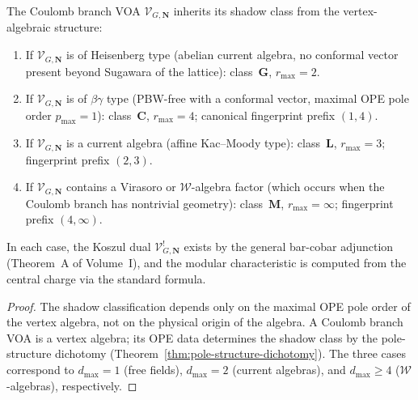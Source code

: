 \begin{proposition}
\label{prop:coulomb-shadow}
The Coulomb branch VOA $\mathcal{V}_{G,\mathbf{N}}$ inherits its
shadow class from the vertex-algebraic structure:
\begin{enumerate}[label=\textup{(\roman*)},nosep]
\item If $\mathcal{V}_{G,\mathbf{N}}$ is of Heisenberg type
 \textup{(}abelian current algebra, no conformal
 vector present beyond Sugawara of the lattice\textup{)}:
 class~$\mathbf{G}$, $r_{\max} = 2$.

\item If $\mathcal{V}_{G,\mathbf{N}}$ is of $\beta\gamma$ type
 \textup{(}PBW-free with a conformal vector, maximal OPE pole
 order $p_{\max} = 1$\textup{)}: class~$\mathbf{C}$,
 $r_{\max} = 4$; canonical fingerprint prefix $(1, 4)$.

\item If $\mathcal{V}_{G,\mathbf{N}}$ is a current algebra
 \textup{(}affine Kac--Moody type\textup{)}:
 class~$\mathbf{L}$, $r_{\max} = 3$; fingerprint prefix $(2, 3)$.

\item If $\mathcal{V}_{G,\mathbf{N}}$ contains a Virasoro
 or $\mathcal{W}$-algebra factor
 \textup{(}which occurs when the Coulomb branch has nontrivial
 geometry\textup{)}: class~$\mathbf{M}$, $r_{\max} = \infty$;
 fingerprint prefix $(4, \infty)$.
\end{enumerate}
In each case, the Koszul dual $\mathcal{V}_{G,\mathbf{N}}^!$
exists by the general bar-cobar adjunction
\textup{(}Theorem~A of Volume~I\textup{)}, and the modular
characteristic is computed from the central charge via the
standard formula.
\end{proposition}

\begin{proof}
The shadow classification depends only on the maximal OPE pole
order of the vertex algebra, not on the physical origin of the
algebra. A Coulomb branch VOA is a vertex algebra; its OPE data
determines the shadow class by the pole-structure dichotomy
(Theorem~\ref{thm:pole-structure-dichotomy}). The three cases
correspond to $d_{\max} = 1$ (free fields), $d_{\max} = 2$
(current algebras), and $d_{\max} \ge 4$ ($\mathcal{W}$-algebras),
respectively.
\end{proof}

